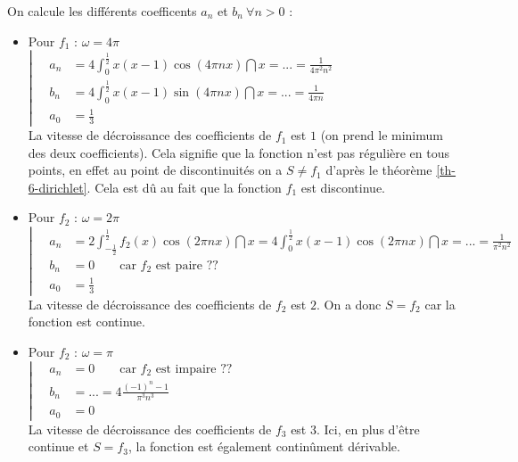 		\bigskip
		On calcule les différents coefficents $a_n$ et $b_n ~ \forall n>0$ :
		\medskip
		\begin{itemize}
			\item Pour $f_1$ : $\omega = 4\pi$
				\\ \smallskip\qquad
				$\left\lvert \quad
				\begin{aligned}
					a_n &= 4 \int_0^\frac{1}{2} x(x-1) \cos(4\pi n x) \dint{x} = ... = \frac{1}{4\pi^2n^2}		\\
					b_n &= 4 \int_0^\frac{1}{2} x(x-1) \sin(4\pi n x) \dint{x} = ... = \frac{1}{4\pi n}			\\
					a_0 &= \frac{1}{3}
				\end{aligned}
				\right.$\smallskip	\\
				La vitesse de décroissance des coefficients de $f_1$ est $1$ (on prend le minimum des deux coefficients). 
				Cela signifie que la fonction n'est pas régulière en tous points, en effet au point de discontinuités on a $S\neq f_1$ d'après le théorème \ref{th-6-dirichlet}. Cela est dû au fait que la fonction $f_1$ est discontinue.
				\bigskip

			\item Pour $f_2$ : $\omega = 2\pi$
				\\ \smallskip\qquad
				$\left\lvert \quad
				\begin{aligned}
					a_n &= 2 \int_{-\frac{1}{2}}^\frac{1}{2} f_2(x) \cos(2\pi nx) \dint{x}
						= 4 \int_0^\frac{1}{2} x(x-1) \cos(2\pi nx) \dint{x}
						= ... = \frac{1}{\pi^2n^2}	\\
					b_n &= 0 \qquad \text{car $f_2$ est paire ??}		\\
					a_0 &= \frac{1}{3}
				\end{aligned}
				\right.$\smallskip	\\
				La vitesse de décroissance des coefficients de $f_2$ est $2$. 
				On a donc $S = f_2$ car la fonction est continue.
				\bigskip

			\item Pour $f_2$ : $\omega = \pi$
				\\ \smallskip\qquad
				$\left\lvert \quad
				\begin{aligned}
					a_n &= 0 \qquad \text{car $f_2$ est impaire ??}		\\
					b_n &= %
						 ... = 4 \frac{(-1)^n - 1}{\pi^3 n^3}	\\
					a_0 &= 0
				\end{aligned}
				\right.$\smallskip	\\
				La vitesse de décroissance des coefficients de $f_3$ est $3$. 
				Ici, en plus d'être continue et $S = f_3$, la fonction est également continûment dérivable.
				\bigskip
		\end{itemize}


